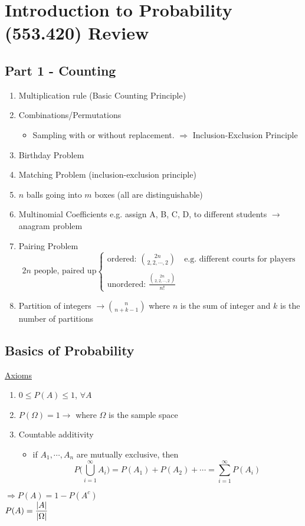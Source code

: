 \section*{Introduction to Probability (553.420) Review}
\subsection*{Part 1 - Counting}
\begin{enumerate}[label=\protect\circled{\arabic*}]
	\item Multiplication rule (Basic Counting Principle)
	\item Combinations/Permutations
	\begin{itemize}
		\item Sampling with or without replacement. $\Rightarrow$ Inclusion-Exclusion Principle
	\end{itemize}
	\item Birthday Problem
	\item Matching Problem (inclusion-exclusion principle)
	\item $n$ balls going into $m$ boxes (all are distinguishable)
	\item Multinomial Coefficients e.g. assign A, B, C, D, to different students $\rightarrow$ anagram problem
	\item Pairing Problem
	\begin{equation*}
		2n \text{ people, paired up}
		\begin{cases}
			\text{ordered: } \binom {2n}{2,2,\cdots,2} \quad \text{e.g. different courts for players}\\\\
			\text{unordered: } \frac{\binom {2n}{2,2,\cdots,2}}{n!}
		\end{cases}
	\end{equation*}
	\item Partition of integers $\rightarrow \binom{n}{n+k-1}$ where $n$ is the sum of integer and $k$ is the number of partitions 
\end{enumerate}
\subsection*{Basics of Probability}
\underline{Axioms}
\begin{enumerate}[label=\protect\circled{\arabic*}]
	\item $0 \leq P(A) \leq 1$, $\forall A$
	\item $P(\Omega) = 1 \rightarrow$ where $\Omega$ is the sample space
	\item Countable additivity
	\begin{itemize}
		\item if $A_1, \cdots, A_n$ are mutually exclusive, then
		\begin{equation*}
			P\bigg(\bigcup\limits_{i=1}^{\infty} A_i\bigg) = P(A_1) + P(A_2) + \cdots = \sum\limits_{i=1}^{\infty} P(A_i)
		\end{equation*}
	\end{itemize}
\end{enumerate}
$\Rightarrow P(A) = 1 - P(A^c)$\\
$P(A) = \mathlarger{\frac{|A|}{|\Omega|}}$
